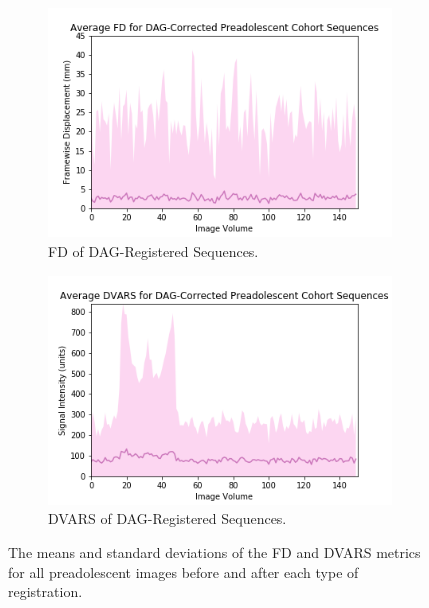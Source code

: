 \begin{figure}
	\begin{subfigure}{0.4\textwidth}
		\centering
		\includegraphics[width=1.0\textwidth]{6/figures/preads-dag-fd-150.png}
		\caption{FD of DAG-Registered Sequences.}
	\end{subfigure}
	\hspace{0.05\textwidth}
	\begin{subfigure}{0.4\textwidth}
		\centering
		\includegraphics[width=1.0\textwidth]{6/figures/preads-dag-dvars-150.png}
		\caption{DVARS of DAG-Registered Sequences.}
	\end{subfigure}
\caption{The means and standard deviations of the FD and DVARS metrics for all preadolescent images before and after each type of registration.}
\label{fig:pread-power-dists}
\end{figure}


